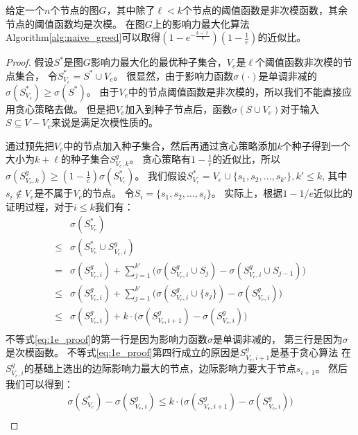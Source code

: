 \begin{theorem}\label{the:naive_greedy}
给定一个$n$个节点的图$G$，其中除了$\ell < k$个节点的阈值函数是非次模函数，其余节点的阈值函数均是次模。
在图$G$上的影响力最大化算法Algorithm\ref{alg:naive_greed}可以取得$(1-e^{-\frac{k-\ell}{k}})(1-\frac{1}{e})$的近似比。
\end{theorem}
\begin{proof}
假设$S^*$是图$G$影响力最大化的最优种子集合，$V_e$是$\ell$个阈值函数非次模的节点集合，
令$S^*_{V_e} = S^* \cup V_e$。
很显然，由于影响力函数$\sigma(\cdot)$是单调非减的$\sigma(S^*_{V_e}) \geq \sigma(S^*)$。
由于$V_e$中的节点阈值函数是非次模的，所以我们不能直接应用贪心策略去做。
但是把$V_e$加入到种子节点后，函数$\sigma(S\cup V_e)$对于输入$S \subseteq V-V_e$来说是满足次模性质的。

通过预先把$V_e$中的节点加入种子集合，然后再通过贪心策略添加$k$个种子得到一个大小为$k+\ell$的种子集合$S^g_{V_e,k}$。
贪心策略有$1-\frac{1}{e}$的近似比，所以$\sigma(S^g_{V_e,k}) \geq (1-\frac{1}{e})\sigma(S^*_{V_e})$。
我们假设$S^*_{V_e}=V_e \cup \{s_1,s_2,\dots,s_{k'}\}, k'\leq k$, 其中$s_i \not\in V_e$是不属于$V_e$的节点。
令$S_i = \{s_1,s_2,\dots,s_i\}$。
实际上，根据$1-1/e$近似比的证明过程，对于$i\leq k$我们有：
\begin{equation}
\label{eq:1e_proof}
\begin{array}{ll}
&\sigma(S^*_{V_e})\\
\leq & \sigma(S^*_{V_e} \cup S^g_{V_e,i})\\
= & \sigma(S^g_{V_e,i}) +
	\sum_{j=1}^{k'} \big( \sigma(S^g_{V_e,i} \cup S_j) - 	
	\sigma(S^g_{V_e,i} \cup S_{j-1})\big)\\
\leq & \sigma(S^g_{V_e,i}) +
	\sum_{j=1}^{k'} \big( \sigma(S^g_{V_e,i} \cup \{s_j\}) - 	
	\sigma(S^g_{V_e,i})\big)\\
\leq & \sigma(S^g_{V_e,i}) +
	k\cdot \big( \sigma(S^g_{V_e,i+1})-\sigma(S^g_{V_e,i})\big)\\
\end{array}
\end{equation}
不等式\ref{eq:1e_proof}的第一行是因为影响力函数$\sigma$是单调非减的，
第三行是因为$\sigma$是次模函数。
不等式\ref{eq:1e_proof}第四行成立的原因是$S^g_{V_e,i+1}$是基于贪心算法
在$S^g_{V_e,i}$的基础上选出的边际影响力最大的节点，边际影响力要大于节点$s_{i+1}$。
然后我们可以得到：
\begin{equation*}
\label{eq:sub_greedy_re}
\begin{array}{ll}
\sigma(S^*_{V_e}) - \sigma(S^g_{V_e,i}) \leq
k\cdot \big( \sigma(S^g_{V_e,i+1})-\sigma(S^g_{V_e,i})\big) \\

\end{array}
\end{equation*}
\end{proof}
